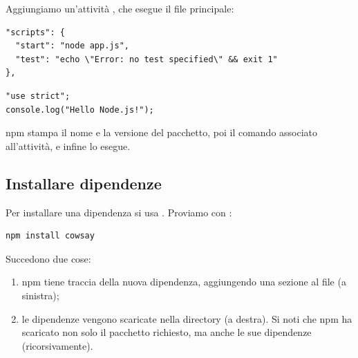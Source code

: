 Aggiungiamo un'attività , che esegue il file principale:

\begin{affianco}[0.55][c]
\begin{lstlisting}[style=json, name=package.json]
"scripts": {
  "start": "node app.js",
  "test": "echo \"Error: no test specified\" && exit 1"
},
\end{lstlisting}
\begin{lstlisting}[style=js, name=app.js]
"use strict";
console.log("Hello Node.js!");
\end{lstlisting}
\risultato
{}
\end{affianco}

npm stampa il nome e la versione del pacchetto, poi il comando associato
all'attività, e infine lo esegue.

\subsection{Installare dipendenze}

Per installare una dipendenza si usa .
Proviamo con :

\begin{lstlisting}[style=shell]
npm install cowsay
\end{lstlisting}

Succedono due cose:

\begin{enumerate}
  \item npm tiene traccia della nuova dipendenza, aggiungendo una sezione
         al file  (a sinistra);
  \item le dipendenze vengono scaricate nella directory 
        (a destra). Si noti che npm ha scaricato non solo il pacchetto
        richiesto, ma anche le sue dipendenze (ricorsivamente).
\end{enumerate}

